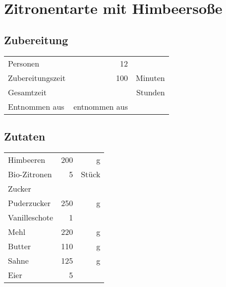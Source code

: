 \section{Zitronentarte mit Himbeersoße} 
\subsection*{Zubereitung}
\begin{tabular}{lrr}
	Personen         &                12 &  \\
	Zubereitungszeit &               100 & Minuten \\
	Gesamtzeit       &                   & Stunden \\
	Entnommen aus    & entnommen aus \cite{Oliver2009} &
\end{tabular} 

\subsection*{Zutaten}
\begin{tabular}{lrr}
	Himbeeren     & 200 &     g \\
	Bio-Zitronen  &   5 & Stück \\
	Zucker        &     &  \\
	Puderzucker   & 250 &     g \\
	Vanilleschote &   1 &  \\
	Mehl          & 220 &     g \\
	Butter        & 110 &     g \\
	Sahne         & 125 &     g \\
	Eier          &   5 &
\end{tabular} 

